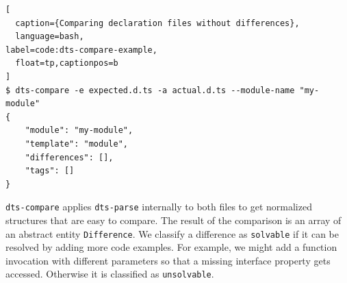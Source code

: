 \documentclass[sigplan,screen]{acmart}
\begin{document}
\begin{lstlisting}[
  caption={Comparing declaration files without differences},
  language=bash,
label=code:dts-compare-example,
  float=tp,captionpos=b
]
$ dts-compare -e expected.d.ts -a actual.d.ts --module-name "my-module"
{
    "module": "my-module",
    "template": "module",
    "differences": [],
    "tags": []
}
\end{lstlisting}

\texttt{dts-compare} applies \texttt{dts-parse} internally to both files to get 
normalized structures that are easy to compare. The result of the comparison is an array
of an abstract entity \texttt{Difference}. 
We classify a difference as \texttt{solvable} if it can be resolved by adding more code
examples. For example, we might add a function invocation with different parameters so that a missing
interface property gets accessed. Otherwise it is classified as  \texttt{unsolvable}. 
\end{document}
